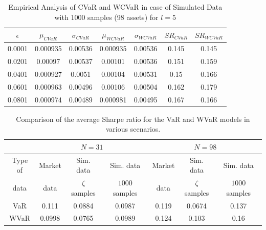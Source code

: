 \documentclass[12pt]{article}
\numberwithin{equation}{section}
\begin{document}
\begin{table}[!h]
    \centering
    \captionsetup{justification=centering}

   \begin{tabular}{||c|c|c|c|c|c|c||}
   \hline
  
$\epsilon$ & $\mu_{CVaR}$ & $\sigma_{CVaR}$ & $\mu_{WCVaR}$ & $\sigma_{WCVaR}$ & $SR_{CVaR}$ & $SR_{WCVaR}$\\
  
  \hline
0.0001 & 0.000935 & 0.00536 & 0.000935 & 0.00536 & 0.145 & 0.145 \\
0.0201 & 0.00097 & 0.00537 & 0.00101 & 0.00536 & 0.151 & 0.159 \\
0.0401 & 0.000927 & 0.0051 & 0.00104 & 0.00531 & 0.15 & 0.166 \\
0.0601 & 0.000963 & 0.00496 & 0.00106 & 0.00504 & 0.162 & 0.179 \\
0.0801 & 0.000974 & 0.00489 & 0.000981 & 0.00495 & 0.167 & 0.166 \\
  \hline
\end{tabular}
    \caption{Empirical Analysis of CVaR and WCVaR in case of Simulated Data with $1000$ samples (98 assets) for $l=5$}
    \label{tab:6.6}
\end{table}

\begin{table}[!h]
  \centering
  \small
    \captionsetup{justification=centering}
  \begin{tabular}{|c|c|c|c|c|c|c|}
    \hline
   \multirow{2}{*}{} $N$ &
      \multicolumn{3}{c|}{$N=31$} &
      \multicolumn{3}{c|}{$N=98$}  \\
    \hline
    Type of & Market & Sim. data & Sim. data & Market & Sim. data & Sim. data \\
    data & data & $\zeta$ samples & $1000$ samples & data & $\zeta$ samples & $1000$ samples \\
    \hline
    VaR & 0.111 & 0.0884 & 0.0987 & 0.119 & 0.0674 & 0.137 \\
    \hline
    WVaR & 0.0998 & 0.0765 & 0.0989 & 0.124 & 0.103 & 0.16 \\
    \hline
    
  \end{tabular}
  \caption{Comparison of the average Sharpe ratio for the VaR and WVaR models in various scenarios.}
  \label{tab:var_conc}
\end{table}
\end{document}
